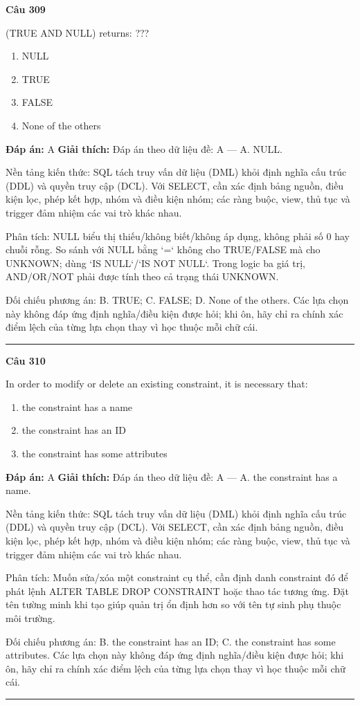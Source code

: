 \documentclass[11pt,a4paper]{article}
\newenvironment{question}[1]{%
  \par\vspace{1em}\noindent\textbf{\large Câu #1}\par\vspace{0.4em}
}{%
  \par\vspace{1em}\hrule\vspace{0.6em}
}
\newenvironment{choices}{%
  \begin{enumerate}[label=\textbf{\Alph*.},leftmargin=2.2em,itemsep=2pt,topsep=3pt]
}{%
  \end{enumerate}
}
\newcommand{\choice}{\item}
\begin{document}
\begin{question}{309}
(TRUE AND NULL) returns: ???
\begin{choices}
\choice NULL
\choice TRUE
\choice FALSE
\choice None of the others
\end{choices}
\textbf{Đáp án:} A
\textbf{Giải thích:} Đáp án theo dữ liệu đề: A — A. NULL.

Nền tảng kiến thức: SQL tách truy vấn dữ liệu (DML) khỏi định nghĩa cấu trúc (DDL) và quyền truy cập (DCL). Với SELECT, cần xác định bảng nguồn, điều kiện lọc, phép kết hợp, nhóm và điều kiện nhóm; các ràng buộc, view, thủ tục và trigger đảm nhiệm các vai trò khác nhau.

Phân tích: NULL biểu thị thiếu/không biết/không áp dụng, không phải số 0 hay chuỗi rỗng. So sánh với NULL bằng `=` không cho TRUE/FALSE mà cho UNKNOWN; dùng `IS NULL`/`IS NOT NULL`. Trong logic ba giá trị, AND/OR/NOT phải được tính theo cả trạng thái UNKNOWN.

Đối chiếu phương án: B. TRUE; C. FALSE; D. None of the others. Các lựa chọn này không đáp ứng định nghĩa/điều kiện được hỏi; khi ôn, hãy chỉ ra chính xác điểm lệch của từng lựa chọn thay vì học thuộc mỗi chữ cái.
\end{question}

\begin{question}{310}
In order to modify or delete an existing constraint, it is necessary that:
\begin{choices}
\choice the constraint has a name
\choice the constraint has an ID
\choice the constraint has some attributes
\end{choices}
\textbf{Đáp án:} A
\textbf{Giải thích:} Đáp án theo dữ liệu đề: A — A. the constraint has a name.

Nền tảng kiến thức: SQL tách truy vấn dữ liệu (DML) khỏi định nghĩa cấu trúc (DDL) và quyền truy cập (DCL). Với SELECT, cần xác định bảng nguồn, điều kiện lọc, phép kết hợp, nhóm và điều kiện nhóm; các ràng buộc, view, thủ tục và trigger đảm nhiệm các vai trò khác nhau.

Phân tích: Muốn sửa/xóa một constraint cụ thể, cần định danh constraint đó để phát lệnh ALTER TABLE DROP CONSTRAINT hoặc thao tác tương ứng. Đặt tên tường minh khi tạo giúp quản trị ổn định hơn so với tên tự sinh phụ thuộc môi trường.

Đối chiếu phương án: B. the constraint has an ID; C. the constraint has some attributes. Các lựa chọn này không đáp ứng định nghĩa/điều kiện được hỏi; khi ôn, hãy chỉ ra chính xác điểm lệch của từng lựa chọn thay vì học thuộc mỗi chữ cái.
\end{question}
\end{document}
